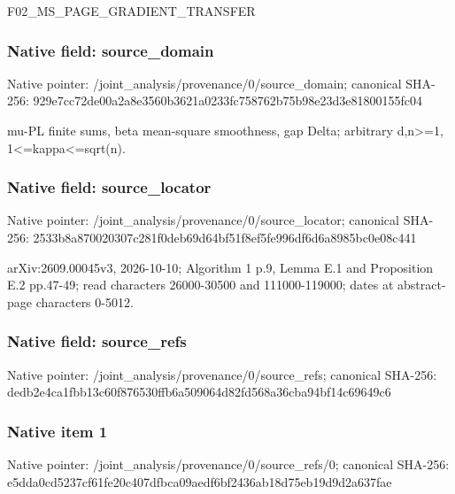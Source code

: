 \documentclass[10pt,a4paper]{article}
\begin{document}
\begingroup\raggedright\sloppy F02\_\allowbreak{}MS\_\allowbreak{}PAGE\_\allowbreak{}GRADIENT\_\allowbreak{}TRANSFER\par\endgroup

\subsubsection{Native field: source\_\allowbreak{}domain}
Native pointer: /joint\_\allowbreak{}analysis/provenance/0/source\_\allowbreak{}domain; canonical SHA-256: 929e7cc72de00a2a8e3560b3621a0233fc758762b75b98e23d3e81800155fc04

\begingroup\raggedright\sloppy mu-PL finite sums,\allowbreak{} beta mean-square smoothness,\allowbreak{} gap Delta;\allowbreak{} arbitrary d,\allowbreak{}n>=\allowbreak{}1,\allowbreak{} 1<=\allowbreak{}kappa<=\allowbreak{}sqrt(n).\par\endgroup

\subsubsection{Native field: source\_\allowbreak{}locator}
Native pointer: /joint\_\allowbreak{}analysis/provenance/0/source\_\allowbreak{}locator; canonical SHA-256: 2533b8a870020307c281f0deb69d64bf51f8ef5fe996df6d6a8985bc0e08c441

\begingroup\raggedright\sloppy arXiv:\allowbreak{}2609.00045v3,\allowbreak{} 2026-10-10;\allowbreak{} Algorithm 1 p.9,\allowbreak{} Lemma E.1 and Proposition E.2 pp.47-49;\allowbreak{} read characters 26000-30500 and 111000-119000;\allowbreak{} dates at abstract-page characters 0-5012.\par\endgroup

\subsubsection{Native field: source\_\allowbreak{}refs}
Native pointer: /joint\_\allowbreak{}analysis/provenance/0/source\_\allowbreak{}refs; canonical SHA-256: dedb2e4ca1fbb13c60f876530ffb6a509064d82fd568a36cba94bf14c69649c6

\subsubsection{Native item 1}
Native pointer: /joint\_\allowbreak{}analysis/provenance/0/source\_\allowbreak{}refs/0; canonical SHA-256: e5dda0cd5237cf61fe20c407dfbca09aedf6bf2436ab18d75eb19d9d2a637fae
\end{document}
